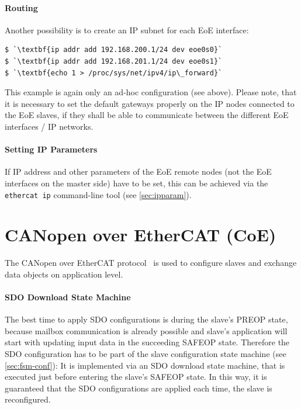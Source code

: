 \documentclass[a4paper,12pt,BCOR=6mm,bibtotoc,idxtotoc]{scrbook}
\begin{document}
\paragraph{Routing} Another possibility is to create an IP subnet for each EoE
interface:

\begin{lstlisting}
$ `\textbf{ip addr add 192.168.200.1/24 dev eoe0s0}`
$ `\textbf{ip addr add 192.168.201.1/24 dev eoe0s1}`
$ `\textbf{echo 1 > /proc/sys/net/ipv4/ip\_forward}`
\end{lstlisting}

This example is again only an ad-hoc configuration (see above). Please note,
that it is necessary to set the default gateways properly on the IP nodes
connected to the EoE slaves, if they shall be able to communicate between the
different EoE interfaces / IP networks.

\paragraph{Setting IP Parameters} If IP address and other parameters of the
EoE remote nodes (not the EoE interfaces on the master side) have to be set,
this can be achieved via the \lstinline+ethercat ip+ command-line tool (see
\autoref{sec:ipparam}).


\section{CANopen over EtherCAT (CoE)}
\label{sec:coe}

The CANopen over EtherCAT protocol~\cite[sec.~5.6]{alspec} is used to configure slaves and
exchange data objects on application level.

%
%

\paragraph{SDO Download State Machine}

The best time to apply SDO configurations is during the slave's PREOP state,
because mailbox communication is already possible and slave's application will
start with updating input data in the succeeding SAFEOP state. Therefore the
SDO configuration has to be part of the slave configuration state machine (see
\autoref{sec:fsm-conf}): It is implemented via an SDO download state machine,
that is executed just before entering the slave's SAFEOP state. In this way,
it is guaranteed that the SDO configurations are applied each time, the slave
is reconfigured.
\end{document}
